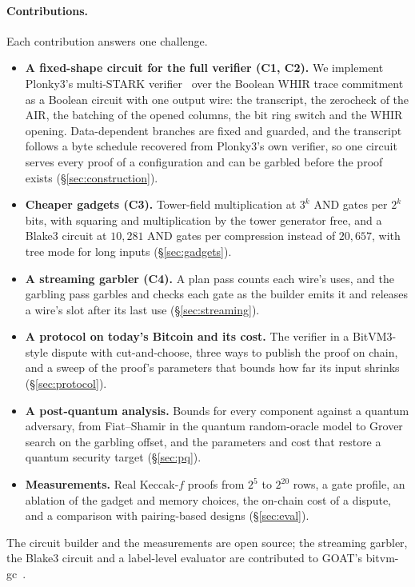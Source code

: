 \documentclass[11pt]{article}
\newcommand{\AND}{\textsf{AND}}
\begin{document}
\paragraph{Contributions.} Each contribution answers one challenge.
\begin{itemize}
  \item \textbf{A fixed-shape circuit for the full verifier (C1, C2).} We
    implement Plonky3's multi-STARK verifier~\cite{plonky3} over the Boolean WHIR
    trace commitment as a Boolean circuit with one output wire: the transcript,
    the zerocheck of the AIR, the batching of the opened columns, the bit ring
    switch and the WHIR opening. Data-dependent branches are fixed and guarded,
    and the transcript follows a byte schedule recovered from Plonky3's own
    verifier, so one circuit serves every proof of a configuration and can be
    garbled before the proof exists (\S\ref{sec:construction}).
  \item \textbf{Cheaper gadgets (C3).} Tower-field multiplication at $3^k$ \AND{}
    gates per $2^k$ bits, with squaring and multiplication by the tower generator
    free, and a Blake3 circuit at $10{,}281$ \AND{} gates per compression instead
    of $20{,}657$, with tree mode for long inputs (\S\ref{sec:gadgets}).
  \item \textbf{A streaming garbler (C4).} A plan pass counts each wire's uses,
    and the garbling pass garbles and checks each gate as the builder emits it and
    releases a wire's slot after its last use (\S\ref{sec:streaming}).
  \item \textbf{A protocol on today's Bitcoin and its cost.} The verifier in a
    BitVM3-style dispute with cut-and-choose, three ways to publish the proof on
    chain, and a sweep of the proof's parameters that bounds how far its
    input shrinks (\S\ref{sec:protocol}).
  \item \textbf{A post-quantum analysis.} Bounds for every component against a
    quantum adversary, from Fiat--Shamir in the quantum random-oracle model to
    Grover search on the garbling offset, and the parameters and cost that
    restore a quantum security target (\S\ref{sec:pq}).
  \item \textbf{Measurements.} Real Keccak-$f$ proofs from $2^5$ to $2^{20}$ rows,
    a gate profile, an ablation of the gadget and memory choices, the on-chain
    cost of a dispute, and a comparison with pairing-based designs
    (\S\ref{sec:eval}).
\end{itemize}
The circuit builder and the measurements are open source; the streaming
garbler, the Blake3 circuit and a label-level evaluator are contributed to
GOAT's bitvm-gc~\cite{bitvmgc}.
\end{document}
